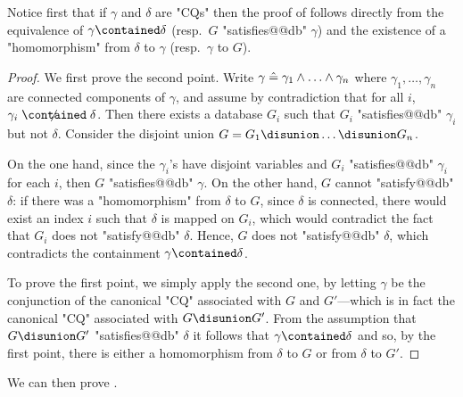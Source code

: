 Notice first that if $\gamma$ and $\delta$ are "CQs" then the proof of
 follows directly from the equivalence of $\gamma \contained \delta$ (resp.\ $G$ "satisfies@@db" $\gamma$) and the existence of a "homomorphism" from $\delta$ to $\gamma$ (resp.\ $\gamma$ to $G$).

\begin{proof}
	We first prove the second point.
    Write $\gamma \mathrel{\hat{=}} \gamma_1 \land \hdots \land \gamma_n$ where $\gamma_1,\hdots,\gamma_n$
    are connected components of $\gamma$, and assume by contradiction that
    for all $i$, $\gamma_i \centernot{\contained} \delta$. Then there exists a database $G_i$
    such that $G_i$ "satisfies@@db" $\gamma_i$ but not $\delta$.
    Consider the disjoint union $G = G_1 \disunion \hdots \disunion G_n$.

    On the one hand, since the $\gamma_i$'s have disjoint variables
    and $G_i$ "satisfies@@db" $\gamma_i$ for each $i$, then $G$ "satisfies@@db" $\gamma$.
    On the other hand, $G$ cannot "satisfy@@db" $\delta$:
    if there was a "homomorphism" from $\delta$ to $G$,
    since $\delta$ is connected, there would exist an index $i$
    such that $\delta$ is mapped on $G_i$, which would contradict the
    fact that $G_i$ does not "satisfy@@db" $\delta$.
    Hence, $G$ does not "satisfy@@db" $\delta$, which contradicts the containment
    $\gamma \contained \delta$.

	To prove the first point, we simply apply the second one, by letting $\gamma$
	be the conjunction of the canonical "CQ" associated with $G$ and $G'$---which
	is in fact the canonical "CQ" associated with $G\disunion G'$. From the assumption
    that $G \disunion G'$ "satisfies@@db" $\delta$ it follows that $\gamma \contained \delta$
    and so, by the first point, there is either a homomorphism from $\delta$
    to $G$ or from $\delta$ to $G'$.
\end{proof}

We can then prove .

